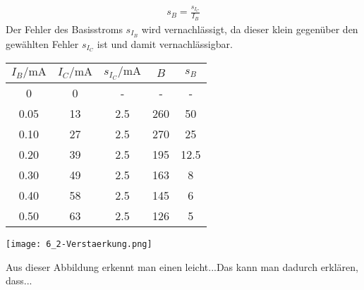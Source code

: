 \begin{align}
    s_B=\frac{s_{I_C}}{I_B}
\end{align}
Der Fehler des Basisstroms $s_{I_B}$ wird vernachlässigt, da dieser klein gegenüber den gewählten Fehler $s_{I_C}$ ist und damit vernachlässigbar.
\begin{center}
    \begin{tabular}{ccccc}
        $I_B/\text{mA}$ & $I_C/\text{mA}$ & $s_{I_C}/\text{mA}$ & $B$ & $s_B$ \\
        \hline
        0     & 0     & -   & -   & - \\
        0.05  & 13    & 2.5   & 260   & 50 \\
        0.10   & 27    & 2.5   & 270   & 25 \\
        0.20   & 39    & 2.5   & 195   & 12.5 \\
        0.30   & 49    & 2.5   & 163   & 8 \\
        0.40   & 58    & 2.5   & 145   & 6 \\
        0.50   & 63    & 2.5   & 126   & 5 \\
        \end{tabular}
\end{center}
\begin{center}
    \texttt{[image: 6\_2-Verstaerkung.png]}
\end{center}
Aus dieser Abbildung erkennt man einen leicht...Das kann man dadurch erkl\"aren, dass...\\